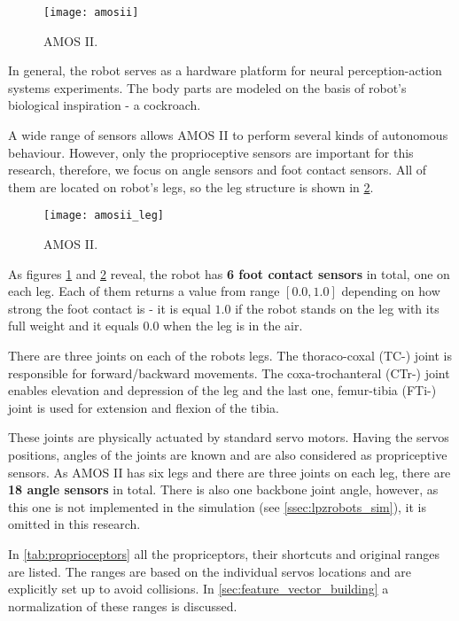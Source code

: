 \begin{figure}[H]
  \centering
  \texttt{[image: amosii]}
  \caption{AMOS II. \citep{misc:amosii}}
  \label{img:amosii}
\end{figure}

In general, the robot serves as a hardware platform for neural perception-action systems experiments. The body parts are modeled on the basis of robot's biological inspiration - a cockroach.

A wide range of sensors allows AMOS II to perform several kinds of autonomous behaviour. However, only the proprioceptive sensors are important for this research, therefore, we focus on angle sensors and foot contact sensors. All of them are located on robot's legs, so the leg structure is shown in \cref{img:amosii_leg}.

\begin{figure}[H]
  \centering
  \texttt{[image: amosii\_leg]}
  \caption{AMOS II. \citep{misc:amosii}}
  \label{img:amosii_leg}
\end{figure}

As figures \ref{img:amosii} and \ref{img:amosii_leg} reveal, the robot has \textbf{6 foot contact sensors} in total, one on each leg. Each of them returns a value from range $ [0.0, 1.0] $ depending on how strong the foot contact is - it is equal $ 1.0 $ if the robot stands on the leg with its full weight and it equals $ 0.0 $ when the leg is in the air.

There are three joints on each of the robots legs. The thoraco-coxal (TC-) joint is responsible for forward/backward movements. The coxa-trochanteral (CTr-) joint enables elevation and depression of the leg and the last one, femur-tibia (FTi-) joint is used for extension and flexion of the tibia.

These joints are physically actuated by standard servo motors. Having the servos positions, angles of the joints are known and are also considered as propriceptive sensors. As AMOS II has six legs and there are three joints on each leg, there are \textbf{18 angle sensors} in total. There is also one backbone joint angle, however, as this one is not implemented in the simulation (see \cref{ssec:lpzrobots_sim}), it is omitted in this research.

In \cref{tab:proprioceptors} all the propriceptors, their shortcuts and original ranges are listed. The ranges are based on the individual servos locations and are explicitly set up to avoid collisions. In \cref{sec:feature_vector_building} a normalization of these ranges is discussed.

